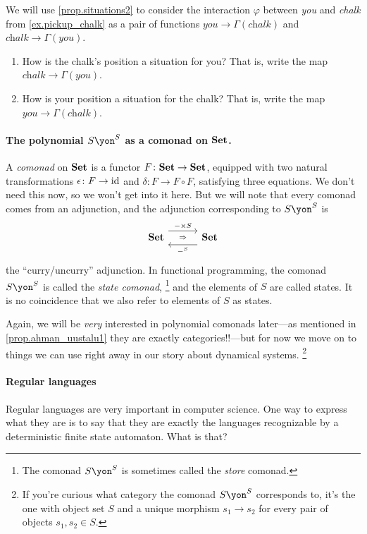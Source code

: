 \documentclass[Book-Poly]{subfiles}
\begin{document}
\begin{exercise}
We will use \cref{prop.situations2} to consider the interaction $\varphi$ between \textit{you} and \textit{chalk} from \cref{ex.pickup_chalk} as a pair of functions $\textit{you}\to\Gamma(\textit{chalk})$ and $\textit{chalk}\to\Gamma(\textit{you})$.
\begin{enumerate}
	\item How is the chalk's position a situation for you? That is, write the map $\textit{chalk}\to\Gamma(\textit{you})$.
	\item How is your position a situation for the chalk? That is, write the map $\textit{you}\to\Gamma(\textit{chalk})$.
\qedhere
\end{enumerate}
\end{exercise}

\paragraph{The polynomial $S\yon^S$ as a comonad on $\textbf{Set}$.}\label{page.poly_comonad}

A \emph{comonad} on $\textbf{Set}$ is a functor $F\colon\textbf{Set}\to\textbf{Set}$, equipped with two natural transformations $\epsilon\colon F\to\mathrm{id}$ and $\delta\colon F\to F\circ F$, satisfying three equations. We don't need this now, so we won't get into it here. But we will note that every comonad comes from an adjunction, and the adjunction corresponding to $S\yon^S$ is
\[
\adj{\smset}{-\times S}{-^S}{\smset}
\]
the ``curry/uncurry'' adjunction. In functional programming, the comonad $S\yon^S$ is called the \emph{state comonad},%
\footnote{The comonad $S\yon^S$ is sometimes called the \emph{store} comonad.} 
and the elements of $S$ are called states. It is no coincidence that we also refer to elements of $S$ as states. 

Again, we will be \emph{very} interested in polynomial comonads later---as mentioned in \cref{prop.ahman_uustalu1} they are exactly categories!!---but for now we move on to things we can use right away in our story about dynamical systems.%
\footnote{If you're curious what category the comonad $S\yon^S$ corresponds to, it's the one with object set $S$ and a unique morphism $s_1\to s_2$ for every pair of objects $s_1,s_2\in S$.}

\paragraph{Regular languages}

Regular languages are very important in computer science. One way to express what they are is to say that they are exactly the languages recognizable by a deterministic finite state automaton. What is that?
\end{document}
